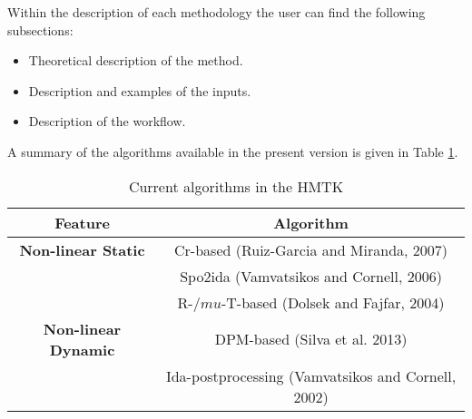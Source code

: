 Within the description of each methodology the user can find the following subsections:
\begin{itemize}
\item Theoretical description of the method.
\item Description and examples of the inputs.
\item Description of the workflow.
\end{itemize}

A summary of the algorithms available in the present version is given in Table \ref{tab:current_features}.
\begin{table}[!htbp]
\centering
\begin{tabular}{|c|c|} \hline
Feature & Algorithm\\ \hline
\textbf{Non-linear Static} & Cr-based (Ruiz-Garcia and Miranda, 2007)\\
    & Spo2ida (Vamvatsikos and Cornell, 2006) \\
    & R-$/mu$-T-based (Dolsek and Fajfar, 2004) \\ \hline
 \textbf{Non-linear Dynamic} & DPM-based (Silva et al. 2013)\\
  & Ida-postprocessing (Vamvatsikos and Cornell, 2002) \\ \hline
\end{tabular}
\caption{Current algorithms in the HMTK}
\label{tab:current_features}
\end{table}


